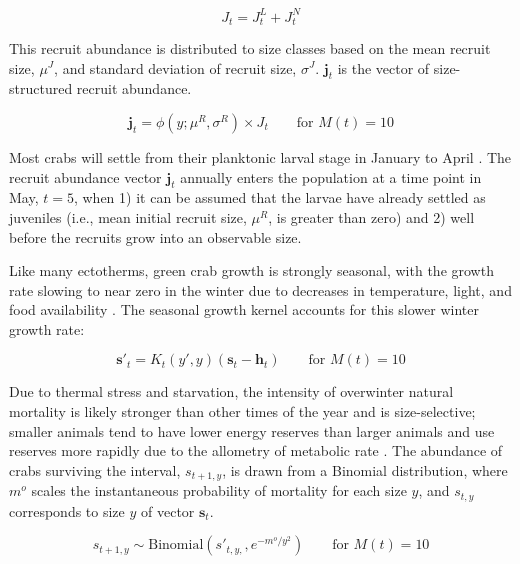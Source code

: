 \documentclass{article}
\begin{document}
\begin{equation}
J_t = J_t^L + J_t^N
\end{equation}

This recruit abundance is distributed to size classes based on the mean recruit size, $\mu^J$, and standard deviation of recruit size, $\sigma^J$. $\textbf{j}_t$ is the vector of size-structured recruit abundance.

\begin{equation}
\textbf{j}_t = \phi(y; \mu^R, \sigma^R) \times J_t \qquad \text{for } M(t) =10
\end{equation}

Most crabs will settle from their planktonic larval stage in January to April \parencite{yamada2005growth}. The recruit abundance vector \textbf{$\textbf{j}_t$} annually enters the population at a time point in May, $t = 5$, when 1) it can be assumed that the larvae have already settled as juveniles (i.e., mean initial recruit size, $\mu^R$, is greater than zero) and 2) well before the recruits grow into an observable size.

Like many ectotherms, green crab growth is strongly seasonal, with the growth rate slowing to near zero in the winter due to decreases in temperature, light, and food availability \parencite{contreras2003population, keller2026integrated}. The seasonal growth kernel accounts for this slower winter growth rate:

\begin{equation}
\textbf{s}'_t = K_t(y',y) (\textbf{s}_t-\textbf{h}_t) \qquad \text{for } M(t) =10
\end{equation}

Due to thermal stress and starvation, the intensity of overwinter natural mortality is likely stronger than other times of the year and is size-selective; smaller animals tend to have lower energy reserves than larger animals and use reserves more rapidly due to the allometry of metabolic rate \parencite{hurst2007causes, henderson1988size}. The abundance of crabs surviving the interval, $s_{t+1,y}$, is drawn from a Binomial distribution, where $m^o$ scales the instantaneous probability of mortality for each size $y$, and $s_{t,y}$ corresponds to size $y$ of vector $\textbf{s}_t$.


\begin{equation}
s_{t+1,y} \sim \text{Binomial}(s'_{t,y,}, e^{-m^o / y^2}) \qquad \text{for } M(t) =10\label{eq:harvest2}
\end{equation}
\end{document}
